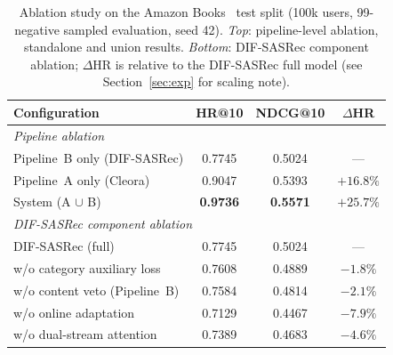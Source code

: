 \begin{table}[tbp]
\caption{Ablation study on the Amazon Books~\cite{hou2024amazon} test split (100k users,
         99-negative sampled evaluation, seed 42).
         \emph{Top}: pipeline-level ablation, standalone and union results.
         \emph{Bottom}: DIF-SASRec component ablation; $\Delta$HR is relative
         to the DIF-SASRec full model (see Section~\ref{sec:exp} for scaling note).}
\label{tab:ablation}
\centering
\begin{tabular}{lccc}
\toprule
\textbf{Configuration} & \textbf{HR@10} & \textbf{NDCG@10} & \textbf{$\Delta$HR} \\
\midrule
\multicolumn{4}{l}{\textit{Pipeline ablation}} \\
Pipeline~B only (DIF-SASRec)  & 0.7745 & 0.5024 & --- \\
Pipeline~A only (Cleora)      & 0.9047 & 0.5393 & $+16.8\%$ \\
System (A $\cup$ B)           & \textbf{0.9736} & \textbf{0.5571} & $+25.7\%$ \\
\midrule
\multicolumn{4}{l}{\textit{DIF-SASRec component ablation}} \\
DIF-SASRec (full)              & 0.7745 & 0.5024 & --- \\
w/o category auxiliary loss   & 0.7608 & 0.4889 & $-1.8\%$ \\
w/o content veto (Pipeline~B) & 0.7584 & 0.4814 & $-2.1\%$ \\
w/o online adaptation         & 0.7129 & 0.4467 & $-7.9\%$ \\
w/o dual-stream attention     & 0.7389 & 0.4683 & $-4.6\%$ \\
\bottomrule
\end{tabular}
\end{table}
